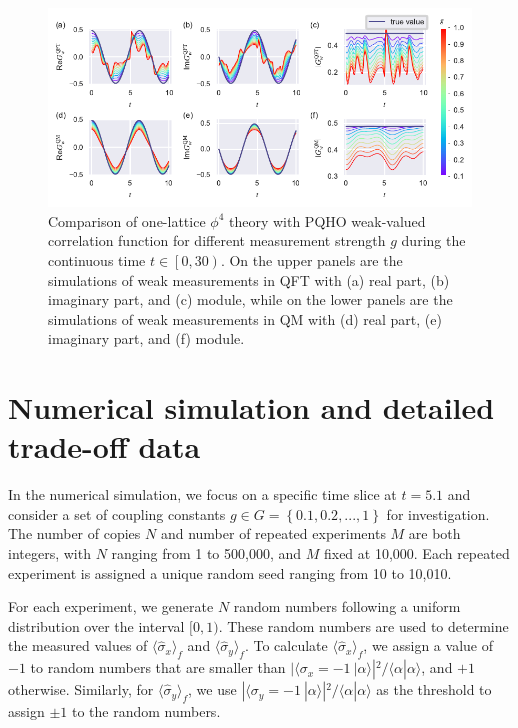 \documentclass[twocolumn,pra,aps,superscriptaddress]{revtex4-2}
\begin{document}
\begin{figure}[!htbp] 
\includegraphics[width=17.2cm]{Fig7}
\caption{\label{S5}  Comparison of one-lattice $\phi^4$ theory with PQHO weak-valued correlation function for different measurement strength $g$ during the continuous time $t\in \left[0,30\right)$. On the upper panels are the simulations of weak measurements in QFT with (a) real part, (b) imaginary part, and (c) module, while on the lower panels are the simulations of weak measurements in QM with (d) real part, (e) imaginary part, and (f) module.}
\end{figure}


\section{Numerical simulation and detailed trade-off data}\label{NSDTD}

In the numerical simulation, we focus on a specific time slice at $t=5.1$ and consider a set of coupling constants $g\in G=\left\{0.1, 0.2, ..., 1\right\}$ for investigation. The number of copies $N$ and number of repeated experiments $M$ are both integers, with $N$ ranging from 1 to 500,000, and $M$ fixed at 10,000. Each repeated experiment is assigned a unique random seed ranging from 10 to 10,010.

For each experiment, we generate $N$ random numbers following a uniform distribution over the interval $[0, 1)$. These random numbers are used to determine the measured values of $\langle\hat{\sigma}_x\rangle_f$ and $\langle\hat{\sigma}_y\rangle_f$. To calculate $\langle\hat{\sigma}_x\rangle_f$, we assign a value of $-1$ to random numbers that are smaller than $|\langle \sigma_x=-1~|\alpha\rangle|^2 / \langle\alpha|\alpha\rangle$, and $+1$ otherwise. Similarly, for $\langle\hat{\sigma}_y\rangle_f$, we use $|\langle \sigma_y=-1~|\alpha\rangle|^2 / \langle\alpha|\alpha\rangle$ as the threshold to assign $\pm 1$ to the random numbers.
\end{document}
